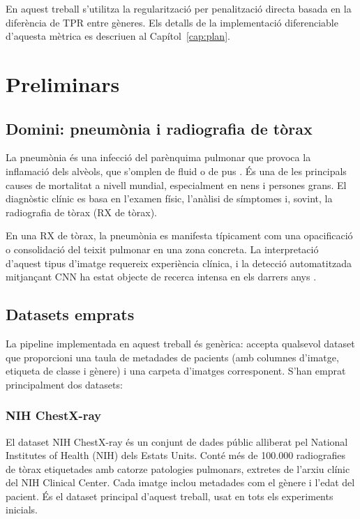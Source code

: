\documentclass[a4paper,12pt,twoside]{ThesisStyle}
\begin{document}
En aquest treball s'utilitza la regularització per penalització directa basada en la diferència de TPR entre gèneres. Els detalls de la implementació diferenciable d'aquesta mètrica es descriuen al Capítol~\ref{cap:plan}.


\chapter{Preliminars}
\label{cap:prelim}

\section{Domini: pneumònia i radiografia de tòrax}

La pneumònia és una infecció del parènquima pulmonar que provoca la inflamació dels alvèols, que s'omplen de fluid o de pus \cite{WHO_pneumonia}. És una de les principals causes de mortalitat a nivell mundial, especialment en nens i persones grans. El diagnòstic clínic es basa en l'examen físic, l'anàlisi de símptomes i, sovint, la radiografia de tòrax (RX de tòrax).

En una RX de tòrax, la pneumònia es manifesta típicament com una opacificació o consolidació del teixit pulmonar en una zona concreta. La interpretació d'aquest tipus d'imatge requereix experiència clínica, i la detecció automatitzada mitjançant CNN ha estat objecte de recerca intensa en els darrers anys \cite{Wang2017}.

\section{Datasets emprats}

La pipeline implementada en aquest treball és genèrica: accepta qualsevol dataset que proporcioni una taula de metadades de pacients (amb columnes d'imatge, etiqueta de classe i gènere) i una carpeta d'imatges corresponent. S'han emprat principalment dos datasets:

\subsection{NIH ChestX-ray}

El dataset NIH ChestX-ray \cite{Wang2017} és un conjunt de dades públic alliberat pel National Institutes of Health (NIH) dels Estats Units. Conté més de 100.000 radiografies de tòrax etiquetades amb catorze patologies pulmonars, extretes de l'arxiu clínic del NIH Clinical Center. Cada imatge inclou metadades com el gènere i l'edat del pacient. És el dataset principal d'aquest treball, usat en tots els experiments inicials.
\end{document}
